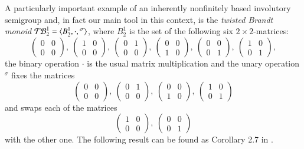\documentclass[preprint,1p,times]{elsarticle}
\numberwithin{equation}{section}
\theoremstyle{remark}
\def\si{\sigma}
\def\TB{\ensuremath{\mathcal{T\kern-1pt B}_2^1}}
\begin{document}
A particularly important example of an inherently nonfinitely based involutory semigroup and, in fact our main tool in this context,
is the \emph{twisted Brandt monoid}  $\TB=\langle B_2^1,\cdot,{}^\si\rangle$, where $B_2^1$ is the set of the
following six $2\times 2$-matrices:
\begin{equation}\label{twisted brandt}
\begin{pmatrix} 0 & 0\\ 0 & 0\end{pmatrix},\
\begin{pmatrix} 1 & 0\\ 0 & 0\end{pmatrix},\
\begin{pmatrix} 0 & 1\\ 0 & 0\end{pmatrix},\
\begin{pmatrix} 0 & 0\\ 1 & 0\end{pmatrix},\
\begin{pmatrix} 0 & 0\\ 0 & 1\end{pmatrix},\
\begin{pmatrix} 1 & 0\\ 0 & 1\end{pmatrix},\end{equation}
the binary operation $\cdot$ is the usual matrix multiplication and the unary operation ${}^\si$ fixes the matrices
$$\begin{pmatrix} 0 & 0\\ 0 & 0\end{pmatrix},\
\begin{pmatrix} 0 & 1\\ 0 & 0\end{pmatrix},\
\begin{pmatrix} 0 & 0\\ 1 & 0\end{pmatrix},\
\begin{pmatrix} 1 & 0\\ 0 & 1\end{pmatrix}$$
and swaps each of the matrices
$$\begin{pmatrix} 1 & 0\\ 0 & 0\end{pmatrix},\
\begin{pmatrix} 0 & 0\\ 0 & 1\end{pmatrix}$$
with the other one. The following result can be found as Corollary 2.7 in \cite{adv}.
\end{document}
